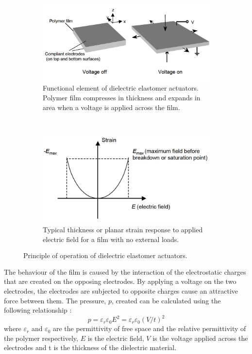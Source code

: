 \begin{figure}[H]
    \centering
    \begin{subfigure}[t]{0.45\textwidth}
			\includegraphics[width=\textwidth]{Figures/DEAP_fig.png}
			\caption{Functional element of dielectric elastomer actuators. Polymer film compresses in thickness and expands in area when a voltage is applied across the film.}
			\label{fig:DEAP_fig}
    \end{subfigure}
    ~ %
    \begin{subfigure}[t]{0.45\textwidth}
			\includegraphics[width=\textwidth]{Figures/DEAP_curve.png}
			\caption{Typical thickness or planar strain response to applied electric field for a film with no external loads.}
			\label{fig:DEAP_curve}
    \end{subfigure}
		\caption{Principle of operation of dielectric elastomer actuators\cite{kornbluh_electroelastomers:_2002}.}
		\label{fig:DEAP}
\end{figure}

The behaviour of the film is caused by the interaction of the electrostatic charges that are created on the opposing electrodes. By applying a voltage on the two electrodes, the electrodes are subjected to opposite charges cause an attractive force between them. The pressure, $p$, created can be calculated\cite{thummala_analysis_2012} using the following relationship :
\begin{equation}
	\label{eq:DEAP_p}
	p = \varepsilon_r\varepsilon_0E^2 = \varepsilon_r\varepsilon_0(V/t)^2
\end{equation}
where $\varepsilon_r$ and $\varepsilon_0$ are the permittivity of free space and the relative permittivity of the polymer respectively, $E$ is the electric field, $V$ is the voltage applied across the electrodes and t is the thickness of the dielectric material.


